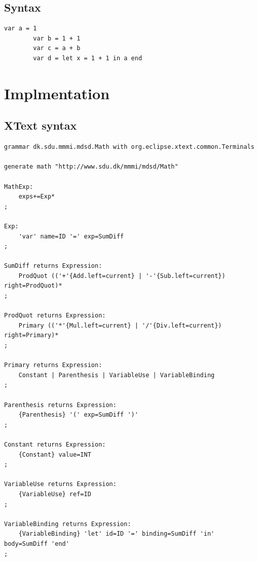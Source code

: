 \documentclass{article}
\begin{document}
\subsection{Syntax}


\begin{center}
    \begin{lstlisting}[language={math}, captionpos={b}, caption={Examples of *.math syntax}]
        var a = 1
        var b = 1 + 1
        var c = a + b
        var d = let x = 1 + 1 in a end
    \end{lstlisting}
\end{center}

\section{Implmentation}

\subsection{XText syntax}
\begin{lstlisting}[caption={XText syntax}, captionpos={b}]
grammar dk.sdu.mmmi.mdsd.Math with org.eclipse.xtext.common.Terminals

generate math "http://www.sdu.dk/mmmi/mdsd/Math"

MathExp:
    exps+=Exp*
;

Exp:
    'var' name=ID '=' exp=SumDiff
;

SumDiff returns Expression:
    ProdQuot (('+'{Add.left=current} | '-'{Sub.left=current}) right=ProdQuot)*
;

ProdQuot returns Expression:
    Primary (('*'{Mul.left=current} | '/'{Div.left=current}) right=Primary)*
;

Primary returns Expression:
    Constant | Parenthesis | VariableUse | VariableBinding
;

Parenthesis returns Expression:
    {Parenthesis} '(' exp=SumDiff ')'
;

Constant returns Expression:
    {Constant} value=INT
;

VariableUse returns Expression:
    {VariableUse} ref=ID
;

VariableBinding returns Expression:
    {VariableBinding} 'let' id=ID '=' binding=SumDiff 'in' body=SumDiff 'end'
;
\end{lstlisting}
\end{document}
